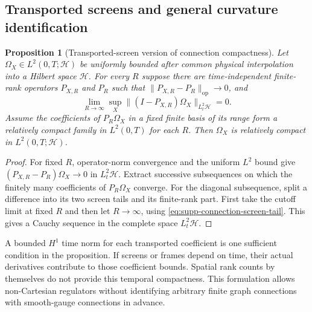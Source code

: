 \documentclass[11pt]{article}
\numberwithin{equation}{section}
\newtheorem{proposition}[proposition]{Proposition}
\theoremstyle{definition}
\theoremstyle{remark}
\begin{document}
\subsection{Transported screens and general curvature identification}

\begin{proposition}[Transported-screen version of connection compactness]
\label{prop:supp-connection-screens}
Let $\Omega_X\in L^2(0,T;\mathcal H)$ be uniformly bounded after common
physical interpolation into a Hilbert space $\mathcal H$. For every $R$
suppose there are time-independent finite-rank operators $P_{X,R}$ and
$P_R$ such that $\|P_{X,R}-P_R\|_{\mathrm{op}}\to0$, and
\begin{equation}
 \lim_{R\to\infty}\sup_X
       \|(I-P_{X,R})\Omega_X\|_{L^2_t\mathcal H}=0.
 \label{eq:supp-connection-screen-tail}
\end{equation}
Assume the coefficients of $P_R\Omega_X$ in a fixed finite basis of its
range form a relatively compact family in $L^2(0,T)$ for each $R$.
Then $\Omega_X$ is relatively compact in $L^2(0,T;\mathcal H)$.
\end{proposition}
\begin{proof}
For fixed $R$, operator-norm convergence and the uniform $L^2$ bound give
$(P_{X,R}-P_R)\Omega_X\to0$ in $L^2_t\mathcal H$. Extract successive
subsequences on which the finitely many coefficients of $P_R\Omega_X$
converge. For the diagonal subsequence, split a difference into its two
screen tails and its finite-rank part. First take the cutoff limit at fixed
$R$ and then let $R\to\infty$, using
\eqref{eq:supp-connection-screen-tail}. This gives a Cauchy sequence in the
complete space $L^2_t\mathcal H$.
\end{proof}

A bounded $H^1$ time norm for each transported coefficient is one sufficient
condition in the proposition. If screens or frames depend on time, their
actual derivatives contribute to those coefficient bounds. Spatial rank
counts by themselves do not provide this temporal compactness. This
formulation allows non-Cartesian regulators without identifying arbitrary
finite graph connections with smooth-gauge connections in advance.
\end{document}
